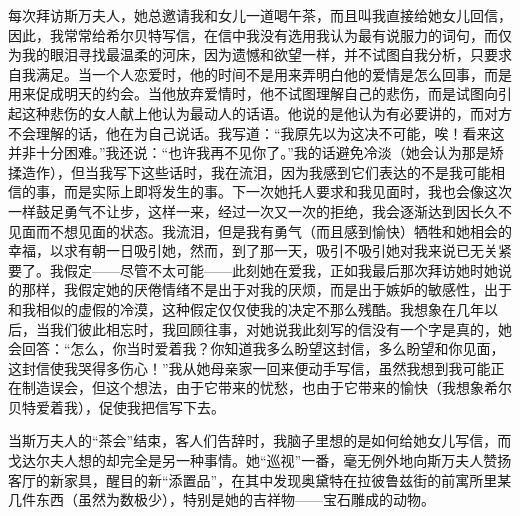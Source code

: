 \par 每次拜访斯万夫人，她总邀请我和女儿一道喝午茶，而且叫我直接给她女儿回信，因此，我常常给希尔贝特写信，在信中我没有选用我认为最有说服力的词句，而仅为我的眼泪寻找最温柔的河床，因为遗憾和欲望一样，并不试图自我分析，只要求自我满足。当一个人恋爱时，他的时间不是用来弄明白他的爱情是怎么回事，而是用来促成明天的约会。当他放弃爱情时，他不试图理解自己的悲伤，而是试图向引起这种悲伤的女人献上他认为最动人的话语。他说的是他认为有必要讲的，而对方不会理解的话，他在为自己说话。我写道：“我原先以为这决不可能，唉！看来这并非十分困难。”我还说：“也许我再不见你了。”我的话避免冷淡（她会认为那是矫揉造作），但当我写下这些话时，我在流泪，因为我感到它们表达的不是我可能相信的事，而是实际上即将发生的事。下一次她托人要求和我见面时，我也会像这次一样鼓足勇气不让步，这样一来，经过一次又一次的拒绝，我会逐渐达到因长久不见面而不想见面的状态。我流泪，但是我有勇气（而且感到愉快）牺牲和她相会的幸福，以求有朝一日吸引她，然而，到了那一天，吸引不吸引她对我来说已无关紧要了。我假定——尽管不太可能——此刻她在爱我，正如我最后那次拜访她时她说的那样，我假定她的厌倦情绪不是出于对我的厌烦，而是出于嫉妒的敏感性，出于和我相似的虚假的冷漠，这种假定仅仅使我的决定不那么残酷。我想象在几年以后，当我们彼此相忘时，我回顾往事，对她说我此刻写的信没有一个字是真的，她会回答：“怎么，你当时爱着我？你知道我多么盼望这封信，多么盼望和你见面，这封信使我哭得多伤心！”我从她母亲家一回来便动手写信，虽然我想到我可能正在制造误会，但这个想法，由于它带来的忧愁，也由于它带来的愉快（我想象希尔贝特爱着我），促使我把信写下去。
\par 当斯万夫人的“茶会”结束，客人们告辞时，我脑子里想的是如何给她女儿写信，而戈达尔夫人想的却完全是另一种事情。她“巡视”一番，毫无例外地向斯万夫人赞扬客厅的新家具，醒目的新“添置品”，在其中发现奥黛特在拉彼鲁兹街的前寓所里某几件东西（虽然为数极少），特别是她的吉祥物——宝石雕成的动物。
